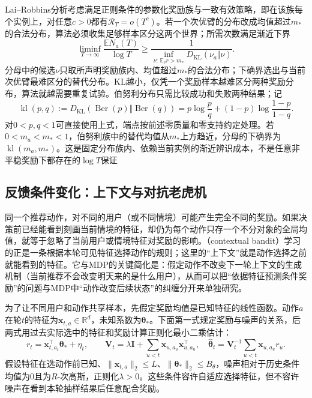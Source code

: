 Lai--Robbins分析考虑满足正则条件的参数化奖励族与一致有效策略，即在该族每个实例上，对任意$c>0$都有$\mathcal R_T=o(T^c)$。若一个次优臂的分布改成均值超过$m_*$的合法分布，算法必须收集足够样本区分这两个世界；所需次数满足渐近下界
\[
  \liminf_{T\to\infty}\frac{\mathbb E N_a(T)}{\log T}
  \geq
  \frac{1}{\inf_{\nu:\,\mathbb E_\nu r>m_*}
                D_{\mathrm{KL}}(\nu_a\Vert\nu)}.
\]
分母中的候选$\nu$只取所声明奖励族内、均值超过$m_*$的合法分布；下确界选出与当前次优臂最难区分的替代分布。KL越小，仅凭一个奖励样本越难区分两种奖励分布，算法就越需要重复试验。伯努利分布只需比较成功和失败两种结果；记
\[
  \operatorname{kl}(p,q)
    :=D_{\mathrm{KL}}(\operatorname{Ber}(p)\Vert\operatorname{Ber}(q))
    =p\log\frac pq+(1-p)\log\frac{1-p}{1-q}.
\]
对$0<p,q<1$可直接使用上式，端点按前述零质量和零支持约定处理。若$0<m_a<m_*<1$，伯努利族中的替代均值从$m_*$上方趋近，分母的下确界为$\operatorname{kl}(m_a,m_*)$。这是固定分布族内、依赖当前实例的渐近辨识成本，不是任意非平稳奖励下都存在的$\log T$保证

\subsection{反馈条件变化：上下文与对抗老虎机}
\label{sec:rl-learning-contextual}

同一个推荐动作，对不同的用户（或不同情境）可能产生完全不同的奖励。如果决策前已经能看到刻画当前情境的特征，却仍为每个动作只存一个不分对象的全局均值，就等于忽略了当前用户或情境特征对奖励的影响。（contextual bandit）学习的正是一条根据本轮可见特征选择动作的规则；这里的“上下文”就是动作选择之前就能看到的特征。它与MDP的关键简化是：假定动作不改变下一轮上下文的生成机制（当前推荐不会改变明天来的是什么用户），从而可以把“依据特征预测条件奖励”的问题与MDP中“动作改变后续状态”的纠缠分开来单独研究。

为了让不同用户和动作共享样本，先假定奖励均值是已知特征的线性函数。动作$a$在轮$t$的特征为$\bm{x}_{t,a}\in\mathbb R^d$，未知系数为$\bm\theta_*$。下面第一式规定奖励与噪声的关系，后两式用过去实际选中的特征和奖励计算正则化最小二乘估计：
\begin{equation}
  r_t=\bm{x}_{t,a_t}^{\top}\bm{\theta}_*+\eta_t,\qquad
  \bm{V}_t=\lambda\bm{I}+\sum_{u<t}\bm{x}_{u,a_u}\bm{x}_{u,a_u}^{\top},
  \quad
  \widehat{\bm{\theta}}_t
  =\bm{V}_t^{-1}\sum_{u<t}\bm{x}_{u,a_u}r_u .
  \label{eq:rl-learning-linear-bandit}
\end{equation}
假设特征在选动作前已知、$\lVert\bm{x}_{t,a}\rVert_2\leq L$、$\lVert\bm{\theta}_*\rVert_2\leq B_{\theta}$，噪声相对于历史条件均值为0且为$R$-次高斯，正则化$\lambda>0$。这些条件容许自适应选择特征，但不容许噪声在看到本轮抽样结果后任意配合奖励。


